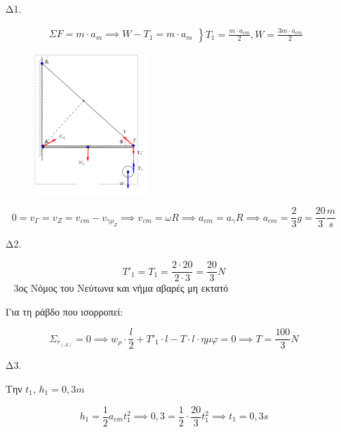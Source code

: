 \documentclass[12pt]{article}
\begin{document}
  \begin{enumerate}
    \item [Δ1.]

    \begin{gather*}
      \left. \begin{matrix}ΣF=m\cdot a_m\implies W-T_1=m\cdot a_m\end{matrix} \right\} T_1=\frac{m\cdot a_{cm}}{2},W=\frac{3m\cdot a_{cm}}{2}
    \end{gather*}

    \begin{figure}[h]
      \includegraphics[width=0.4\textwidth]{ΦυσικήΔ1.png}
      \centering
    \end{figure}

    $$0=v_Γ=v_Z=v_{cm}-v_{γρ_Ζ}\implies v_{cm}=ωR\implies a_{cm}=a_γ R\implies a_{cm}=\frac{2}{3}g=\frac{20}{3}\frac{m}{s}$$



    \item [Δ2.]

    $$T'_1=T_1=\frac{2\cdot 20}{2\cdot 3}=\frac{20}{3}N$$
  
    3ος Νόμος του Νεύτωνα και νήμα αβαρές μη εκτατό

    Για τη ράβδο που ισορροπεί:

    $$Σ_{τ_{(Α)}}=0\implies w_ρ\cdot\frac{l}{2}+T'_1\cdot l-T\cdot l\cdot ημφ=0\implies T=\frac{100}{3}N$$

    \item [Δ3.]

    Την $t_1$, $h_1=0,3m$

    $$h_1=\frac{1}{2}a_{cm}t_1^2\implies 0,3=\frac{1}{2}\cdot\frac{20}{3}t_1^2\implies t_1=0,3s$$



\end{enumerate}
\end{document}
